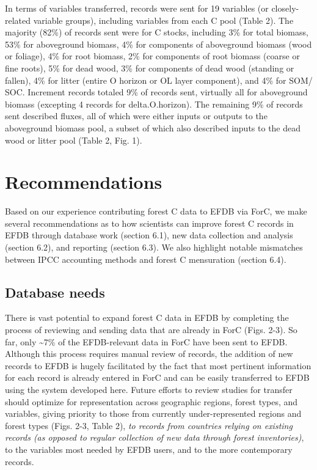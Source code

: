 \documentclass[, manuscript]{copernicus}
\begin{document}
In terms of variables transferred, records were sent for 19 variables
(or closely-related variable groups), including variables from each C
pool (Table 2). The majority (82\%) of records sent were for C stocks,
including 3\% for total biomass, 53\% for aboveground biomass, 4\% for
components of aboveground biomass (wood or foliage), 4\% for root
biomass, 2\% for components of root biomass (coarse or fine roots), 5\%
for dead wood, 3\% for components of dead wood (standing or fallen), 4\%
for litter (entire O horizon or OL layer component), and 4\% for SOM/
SOC. Increment records totaled 9\% of records sent, virtually all for
aboveground biomass (excepting 4 records for delta.O.horizon). The
remaining 9\% of records sent described fluxes, all of which were either
inputs or outputs to the aboveground biomass pool, a subset of which
also described inputs to the dead wood or litter pool (Table 2, Fig. 1).

\section{Recommendations}

Based on our experience contributing forest C data to EFDB via ForC, we
make several recommendations as to how scientists can improve forest C
records in EFDB through database work (section 6.1), new data collection
and analysis (section 6.2), and reporting (section 6.3). We also
highlight notable mismatches between IPCC accounting methods and forest
C mensuration (section 6.4).

\subsection{Database needs}

There is vast potential to expand forest C data in EFDB by completing
the process of reviewing and sending data that are already in ForC
(Figs. 2-3). So far, only \textasciitilde7\% of the EFDB-relevant data
in ForC have been sent to EFDB. Although this process requires manual
review of records, the addition of new records to EFDB is hugely
facilitated by the fact that most pertinent information for each record
is already entered in ForC and can be easily transferred to EFDB using
the system developed here. Future efforts to review studies for transfer
should optimize for representation across geographic regions, forest
types, and variables, giving priority to those from currently
under-represented regions and forest types (Figs. 2-3, Table 2),
\emph{to records from countries relying on existing records (as opposed
to regular collection of new data through forest inventories)}, to the
variables most needed by EFDB users, and to the more contemporary
records.
\end{document}
